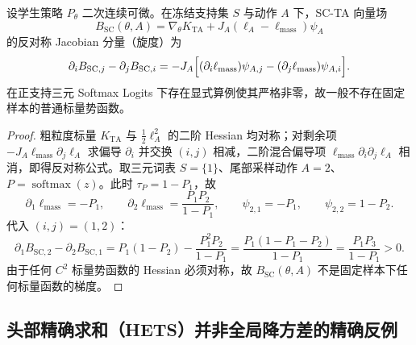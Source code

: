 \documentclass[lang=cn,scheme=chinese,openany]{elegantbook}
\begin{document}
\begin{proposition}
\label{est:sc-curl}
设学生策略 $P_\theta$ 二次连续可微。在冻结支持集 $S$ 与动作 $A$ 下，SC-TA 向量场
\begin{equation}
B_{\mathrm{SC}}(\theta,A)=\nabla_\theta K_{\mathrm{TA}}+J_A(\ell_A-\ell_{\mathrm{mass}})\psi_A
\end{equation}
的反对称 Jacobian 分量（旋度）为
\begin{equation}
\partial_i B_{\mathrm{SC},j}-\partial_j B_{\mathrm{SC},i}
=-J_A\Bigl[(\partial_i\ell_{\mathrm{mass}})\psi_{A,j}
-(\partial_j\ell_{\mathrm{mass}})\psi_{A,i}\Bigr].
\end{equation}
在正支持三元 Softmax Logits 下存在显式算例使其严格非零，故一般不存在固定样本的普通标量势函数。
\end{proposition}
\begin{proof}
粗粒度标量 $K_{\mathrm{TA}}$ 与 $\frac12\ell_A^2$ 的二阶 Hessian 均对称；对剩余项 $-J_A\ell_{\mathrm{mass}}\partial_j\ell_A$ 求偏导 $\partial_i$ 并交换 $(i,j)$ 相减，二阶混合偏导项 $\ell_{\mathrm{mass}}\partial_i\partial_j\ell_A$ 相消，即得反对称公式。取三元词表 $S=\{1\}$、尾部采样动作 $A=2$、$P=\operatorname{softmax}(z)$。此时 $\tau_P=1-P_1$，故
\begin{equation}
\partial_1\ell_{\mathrm{mass}}=-P_1,\qquad
\partial_2\ell_{\mathrm{mass}}=\frac{P_1 P_2}{1-P_1},\qquad
\psi_{2,1}=-P_1,\qquad \psi_{2,2}=1-P_2.
\end{equation}
代入 $(i,j)=(1,2)$：
\begin{equation}
\partial_1 B_{\mathrm{SC},2}-\partial_2 B_{\mathrm{SC},1}
=P_1(1-P_2)-\frac{P_1^2 P_2}{1-P_1}
=\frac{P_1(1-P_1-P_2)}{1-P_1}
=\frac{P_1 P_3}{1-P_1}>0.
\end{equation}
由于任何 $C^2$ 标量势函数的 Hessian 必须对称，故 $B_{\mathrm{SC}}(\theta,A)$ 不是固定样本下任何标量函数的梯度。
\end{proof}

\subsection{头部精确求和（HETS）并非全局降方差的精确反例}
\label{est:hets-counterexamples}
\end{document}
